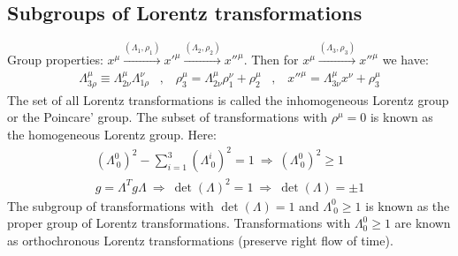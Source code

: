 \subsection{Subgroups of Lorentz transformations}

Group properties: $x^\mu \stackrel{(\Lambda_1,\rho_1)}{\longrightarrow}
x'^{\mu} \stackrel{(\Lambda_2 , \rho_2)}{\longrightarrow} x''^{\mu}$. Then
for $x^\mu \stackrel{(\Lambda_3 , \rho_3)}{\longrightarrow} x''^\mu$ we have:
\begin{align*}
    \Lambda_{3 \rho}^\mu \equiv \Lambda_{2 \nu}^\mu \Lambda_{1 \rho}^\nu
    \hspace{10pt} , \hspace{10pt}
    \rho_3^\mu = \Lambda_{2 \nu}^\mu \rho_1^\nu + \rho_2^\mu
    \hspace{10pt} , \hspace{10pt}
    x''^\mu = \Lambda_{3 \nu}^\mu x^\nu + \rho_3^\mu
\end{align*}
The set of all Lorentz transformations is called the inhomogeneous Lorentz
group or the Poincare' group. The subset of transformations with $\rho^\mu = 0$
is known as the homogeneous Lorentz group. Here:
\begin{align*}
    (\Lambda_{\ 0}^0)^2 - \sum_{i=1}^3 (\Lambda_{\ 0}^i)^2 = 1
    \ \Rightarrow \ (\Lambda_{\ 0}^0)^2 \geq 1
    \\
    g = \Lambda^T g \Lambda \ \Rightarrow \ \det (\Lambda)^2 = 1
    \ \Rightarrow \ \det(\Lambda) = \pm 1
\end{align*}
The subgroup of transformations with $\det(\Lambda) = 1$ and $\Lambda_{\ 0}^0 \geq 1$
is known as the proper group of Lorentz transformations. Transformations with
$\Lambda_0^0 \geq 1$ are known as orthochronous Lorentz transformations
(preserve right flow of time).

